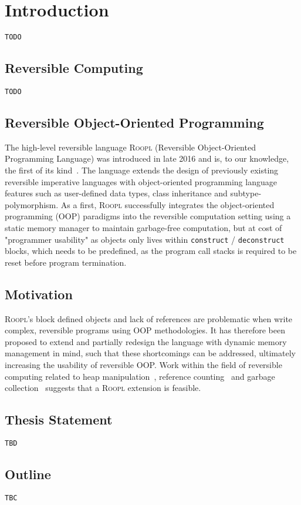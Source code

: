 \chapter{Introduction}
\texttt{TODO}
% 

\section{Reversible Computing}
\texttt{TODO}

\section{Reversible Object-Oriented Programming}
The high-level reversible language \textsc{Roopl} (Reversible Object-Oriented Programming Language) was introduced in late 2016 and is, to our knowledge, the first of its kind~\cite{th:roopl}. The language extends the design of previously existing reversible imperative languages with object-oriented programming language features such as user-defined data types, class inheritance and subtype-polymorphism. As a first, \textsc{Roopl} successfully integrates the object-oriented programming (OOP) paradigms into the reversible computation setting using a static memory manager to maintain garbage-free computation, but at cost of "programmer usability" as objects only lives within \texttt{construct} / \texttt{deconstruct} blocks, which needs to be predefined, as the program call stacks is required to be reset before program termination.

\section{Motivation}
\textsc{Roopl}'s block defined objects and lack of references are problematic when write complex, reversible programs using OOP methodologies. It has therefore been proposed to extend and partially redesign the language with dynamic memory management in mind, such that these shortcomings can be addressed, ultimately increasing the usability of reversible OOP. Work within the field of reversible computing related to heap manipulation~\cite{ha:heap}, reference counting~\cite{tm:refcounting} and garbage collection~\cite{tm:garbage} suggests that a \textsc{Roopl} extension is feasible.



\section{Thesis Statement}
\texttt{TBD}

\section{Outline}
\texttt{TBC}